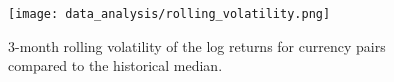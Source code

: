 \begin{figure}[!htb]
    \begin{center}
        \texttt{[image: data\_analysis/rolling\_volatility.png]}
    \end{center}
    \caption{3-month rolling volatility of the log returns for currency pairs compared to the historical median.}
    \label{fig:rolling_volatility}
\end{figure}
